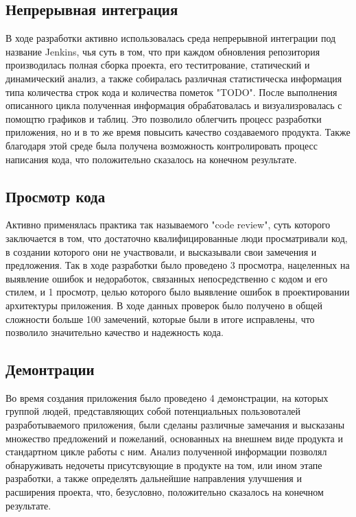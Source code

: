 \subsection{Непрерывная интеграция}

В ходе разработки активно использовалась среда непрерывной интеграции под название Jenkins, чья суть в том, что при каждом обновления репозитория производилась полная сборка проекта, его теститрование, статический и динамический анализ, а также собиралась различная статистическа информация типа количества строк кода и количества пометок "TODO". После выполнения описанного цикла полученная информация обрабатовалась и визуализровалась с помощтю графиков и таблиц. Это позволило облегчить процесс разработки приложения, но и в то же время повысить качество создаваемого продукта. Также благодаря этой среде была получена возможность контролировать процесс написания кода, что положительно сказалось на конечном результате.

\subsection{Просмотр кода}

Активно применялась практика так называемого "code review", суть которого заключается в том, что достаточно квалифицированные люди просматривали код, в создании которого они не участвовали, и высказывали свои замечения и предложения. Так в ходе разработки было проведено 3 просмотра, нацеленных на выявление ошибок и недоработок, связанных  непосредственно с кодом и его стилем, и 1 просмотр, целью которого было выявление ошибок в проектировании архитектуры приложения. В ходе данных проверок было получено в общей сложности больше 100 замечений, которые были в итоге исправлены, что позволило значительно качество и надежность кода.   

\subsection{Демонтрации}

Во время создания приложения было проведено 4 демонстрации, на которых группой людей, представляющих собой потенциальных пользовоталей разработываемого приложения, были сделаны различные замечания и высказаны множество предложений и пожеланий, основанных на внешнем виде продукта и стандартном цикле работы с ним. Анализ полученной информации позволял обнаруживать недочеты присутсвующие в продукте на том, или ином этапе разработки, а также определять дальнейшие направления улучшения и расширения проекта, что, безусловно, положительно сказалось на конечном результате.

